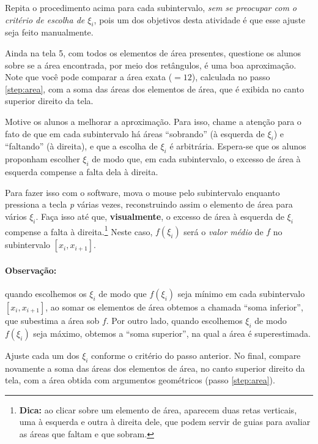 \documentclass[a4paper,12pt]{scrartcl}
\begin{document}
\begin{list}{.}
      Repita o procedimento acima para cada subintervalo, \emph{sem se preocupar com o critério de escolha de $\xi_i$}, pois um dos objetivos desta atividade é que esse ajuste seja feito manualmente.
      
      \item Ainda na tela 5, com todos os elementos de área presentes, questione os alunos sobre se a área encontrada, por meio dos retângulos, é uma boa aproximação. Note que você pode comparar a área exata ($=12$), calculada no passo \ref{step:area}, com a soma das áreas dos elementos de área, que é exibida no canto superior direito da tela.
      
      \item Motive os alunos a melhorar a aproximação. Para isso, chame a atenção para o fato de que em cada subintervalo há áreas ``sobrando'' (à esquerda de $\xi_i$) e ``faltando'' (à direita), e que a escolha de $\xi_i$ é arbitrária. Espera-se que os alunos proponham escolher $\xi_i$ de modo que, em cada subintervalo, o excesso de área à esquerda compense a falta dela à direita.
      
      Para fazer isso com o software, mova o mouse pelo subintervalo enquanto pressiona a tecla \textit{p} várias vezes, reconstruindo assim o elemento de área para vários $\xi_i$. Faça isso até que, \textbf{visualmente}, o excesso de área à esquerda de $\xi_i$ compense a falta à direita.\footnote{\textbf{Dica:} ao clicar sobre um elemento de área, aparecem duas retas verticais, uma à esquerda e outra à direita dele, que podem servir de guias para avaliar as áreas que faltam e que sobram.} Neste caso, $f(\xi_i)$ será o \emph{valor médio} de $f$ no subintervalo $[x_i, x_{i+1}]$.
      
      \paragraph{Observação:} quando escolhemos os $\xi_i$ de modo que $f(\xi_i)$ seja mínimo em cada subintervalo $[x_i,x_{i+1}]$, ao somar os elementos de área obtemos a chamada ``soma inferior'', que subestima a área sob $f$. Por outro lado, quando escolhemos $\xi_i$ de modo $f(\xi_i)$ seja máximo, obtemos a ``soma superior'', na qual a área é superestimada.
      
      \item Ajuste cada um dos $\xi_i$ conforme o critério do passo anterior. No final, compare novamente a soma das áreas dos elementos de área, no canto superior direito da tela, com a área obtida com argumentos geométricos (passo \ref{step:area}).
      

\end{list}
\end{document}
